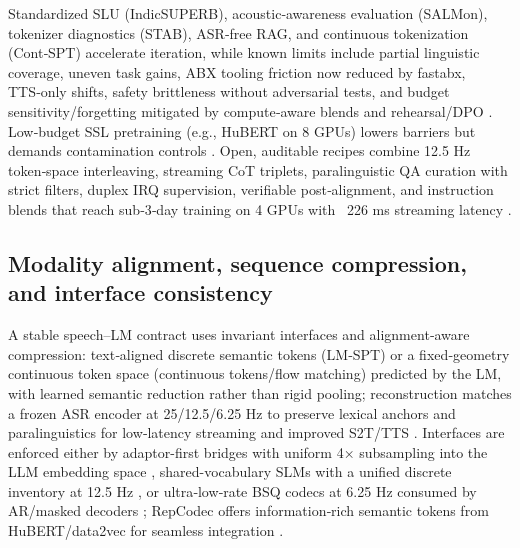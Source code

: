 Standardized SLU (IndicSUPERB), acoustic‑awareness evaluation (SALMon), tokenizer diagnostics (STAB), ASR‑free RAG, and continuous tokenization (Cont‑SPT) accelerate iteration, while known limits include partial linguistic coverage, uneven task gains, ABX tooling friction now reduced by fastabx, TTS‑only shifts, safety brittleness without adversarial tests, and budget sensitivity/forgetting mitigated by compute‑aware blends and rehearsal/DPO \cite{entry2025indicsuperbspeechprocessinguniversalperf,maimon2025salmonsuiteacousticlanguagemodelevaluati,vashishth2024stabspeechtokenizerassessmentbenchmark,min2025speechretrievalaugmentedgenerationwithou,li2025continuousspeechtokenizertext,poli2025fastabxlibraryefficientcomputationabxdis,wang2023slmbridgethingapbetweenspeechtextfoundat,maimon2025slammingtrainingspeechlanguagemodelonegp}. Low‑budget SSL pretraining (e.g., HuBERT on 8 GPUs) lowers barriers but demands contamination controls \cite{chen2023reducingbarriersselfsupervisedlearninghu,tseng2025evaluationllmsspeechisoftenflawedtestset}. Open, auditable recipes combine 12.5 Hz token‑space interleaving, streaming CoT triplets, paralinguistic QA curation with strict filters, duplex IRQ supervision, verifiable post‑alignment, and instruction blends that reach sub‑3‑day training on 4 GPUs with ~226 ms streaming latency \cite{zeng2024scalingspeechtextpretrainingsyntheticint,guo2025streamuniachievingstreamingspeechtransla,wang2025incorporatingcontextualparalinguisticund,ma2024languagemodelcanlistenwhilespeaking,li2025seewossubmissionmlcslmlessonslearnedspee,peng2025voicetextblenderaugmentinglargelanguagem,fang2025llamaomniseamlessspeechinteractionlargel,maimon2025slammingtrainingspeechlanguagemodelonegp,lu2025desta2developinginstructionfollowingspee}.

\subsection{Modality alignment, sequence compression, and interface consistency} \label{subsec:Modality alignment, sequence compression, and interface consistency}
A stable speech–LM contract uses invariant interfaces and alignment‑aware compression: text‑aligned discrete semantic tokens (LM‑SPT) or a fixed‑geometry continuous token space (continuous tokens/flow matching) predicted by the LM, with learned semantic reduction rather than rigid pooling; reconstruction matches a frozen ASR encoder at 25/12.5/6.25 Hz to preserve lexical anchors and paralinguistics for low‑latency streaming and improved S2T/TTS \cite{jo2025lmsptalignedsemanticdistillationspeechto,yuan2024continuousspeechtokensmakesllmsrobustmul}. Interfaces are enforced either by adaptor-first bridges with uniform 4× subsampling into the LLM embedding space \cite{wang2023slmbridgethingapbetweenspeechtextfoundat}, shared-vocabulary SLMs with a unified discrete inventory at 12.5 Hz \cite{zeng2024scalingspeechtextpretrainingsyntheticint}, or ultra‑low‑rate BSQ codecs at 6.25 Hz consumed by AR/masked decoders \cite{wang2025tadicodectextawarediffusionspeechtokeniz}; RepCodec offers information‑rich semantic tokens from HuBERT/data2vec for seamless integration \cite{huang2024repcodecspeechrepresentationcodectokeniz}.


